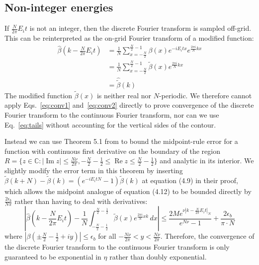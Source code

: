 \documentclass[aps,floatfix,10pt,amssymb,amsfont,amsmath,superscriptaddress,float,nofootinbib,longbibliography,nobalancelastpage,twocolumn]{revtex4-2}
\begin{document}
\subsection{Non-integer energies}
If $\frac{N}{2\pi}E_it$ is not an integer, then the discrete Fourier transform is sampled off-grid. This can be reinterpreted as the on-grid Fourier transform of a modified function:
\begin{align}
    \hat \beta(k -\frac{N}{2\pi}E_it) &= \frac{1}{N} \sum_{x=-\frac{N}{2}}^{\frac{N}{2}-1} \beta(x) e^{-iE_it x}e^{\frac{2\pi i}{N} kx}\\
    &= \frac{1}{N} \sum_{x=-\frac{N}{2}}^{\frac{N}{2}-1} \tilde\beta(x)e^{\frac{2\pi i}{N} kx}\\
    &= \hat{\tilde\beta}(k)
\end{align}
The modified function $\tilde\beta(x)$ is neither real nor $N$-periodic. We therefore cannot apply Eqs.~\eqref{eq:conv1} and~\eqref{eq:conv2} directly to prove convergence of the discrete Fourier transform to the continuous Fourier transform, nor can we use Eq.~\eqref{eq:tails} without accounting for the vertical sides of the contour.

Instead we can use Theorem 5.1 from \cite{javed2014trapezoidal} to bound the midpoint-rule error for a function with continuous first derivative on the boundary of the region $R = \{z \in \mathbb{C}: |\operatorname{Im} z| \leq  \frac{N\nu}{2\pi}, -\frac{N}{2}-\frac{1}{2}\leq\operatorname{Re} z \leq \frac{N}{2}-\frac{1}{2}\}$ and analytic in its interior. We slightly modify the error term in this theorem by inserting $\tilde \beta(k+N)- \tilde \beta(k)= (e^{-iE_i tN}-1)\tilde \beta(k)$ at equation (4.9) in their proof, which allows the midpoint analogue of equation (4.12) to be bounded directly by $\frac{2\epsilon_b}{N\pi}$ rather than having to deal with derivatives:
\begin{equation}
    \left| \hat \beta\!\left(k-\frac{N}{2\pi}E_it\right) - \frac{1}{N} \int_{-\frac{N}{2}-\frac{1}{2}}^{\frac{N}{2}-\frac{1}{2}}\tilde\beta(x)e^{\frac{2\pi i}{N}xk}\,dx \right| \leq \frac{2 Me^{\nu|k-\frac{N}{2\pi}E_i t|_{N}}}{e^{N\nu}-1} + \frac{2\epsilon_{b}}{\pi\cdot N}
\end{equation}
where $|\beta(\pm\frac{N}{2}-\frac{1}{2}+iy)| \leq \epsilon_{b}$ for all $-\frac{N\nu}{2\pi}<y<\frac{N\nu}{2\pi}$. Therefore, the convergence of the discrete Fourier transform to the continuous Fourier transform is only guaranteed to be exponential in $\eta$ rather than doubly exponential.
\end{document}

